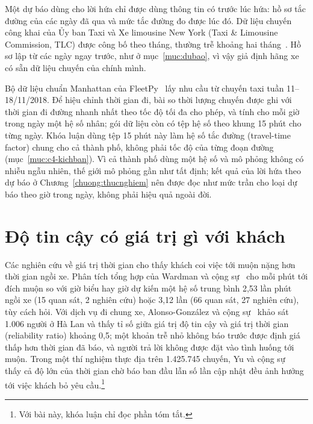 Một dự báo dùng cho lời hứa chỉ được dùng thông tin có trước lúc hứa: hồ sơ tắc đường của các ngày đã qua và mức tắc
đường đo được lúc đó. Dữ liệu chuyến công khai của Ủy ban Taxi và Xe limousine New York (Taxi \& Limousine
Commission, TLC) được công bố theo tháng, thường trễ khoảng hai tháng~\cite{tlc}. Hồ sơ lập từ các ngày ngay trước, như
ở mục~\ref{muc:dubao}, vì vậy giả định hãng xe có sẵn dữ liệu chuyến của chính mình.

Bộ dữ liệu chuẩn Manhattan của FleetPy~\cite{engelhardt2026} lấy nhu cầu từ chuyến taxi tuần 11--18/11/2018. Để hiệu
chỉnh thời gian đi, bài so thời lượng chuyến được ghi với thời gian đi đường nhanh nhất theo tốc độ tối đa cho phép,
và tính cho mỗi giờ trong ngày một hệ số nhân; gói dữ liệu còn có tệp hệ số theo khung 15 phút cho từng ngày. Khóa
luận dùng tệp 15 phút này làm hệ số tắc đường (travel-time factor) chung cho cả thành phố, không phải tốc độ của từng
đoạn đường (mục~\ref{muc:c4-kichban}). Vì cả thành phố dùng một hệ số và mô phỏng không có nhiễu ngẫu nhiên, thế giới
mô phỏng gần như tất định; kết quả của lời hứa theo dự báo ở Chương~\ref{chuong:thucnghiem} nên được đọc như mức trần
cho loại dự báo theo giờ trong ngày, không phải hiệu quả ngoài đời.

\section{Độ tin cậy có giá trị gì với khách}
\label{muc:c2-giatri}

Các nghiên cứu về giá trị thời gian cho thấy khách coi việc tới muộn nặng hơn thời gian ngồi xe. Phân tích tổng hợp
của Wardman và cộng sự~\cite{wardman2026} cho mỗi phút tới đích muộn so với giờ biểu hay giờ dự kiến một hệ số trung
bình 2,53 lần phút ngồi xe (15 quan sát, 2 nghiên cứu) hoặc 3,12 lần (66 quan sát, 27 nghiên cứu), tùy cách hỏi. Với
dịch vụ đi chung xe, Alonso-González và cộng sự~\cite{alonsogonzalez2020} khảo sát 1.006 người ở Hà Lan và thấy tỉ số
giữa giá trị độ tin cậy và giá trị thời gian (reliability ratio) khoảng 0,5; một khoản trễ nhỏ không báo trước được
định giá thấp hơn thời gian đã báo, và người trả lời không được đặt vào tình huống tới muộn. Trong một thí nghiệm thực
địa trên 1.425.745 chuyến, Yu và cộng sự~\cite{yu2022} thấy cả độ lớn của thời gian chờ báo ban đầu lẫn số lần cập
nhật đều ảnh hưởng tới việc khách bỏ yêu cầu.\footnote{Với bài này, khóa luận chỉ đọc phần tóm tắt.}

